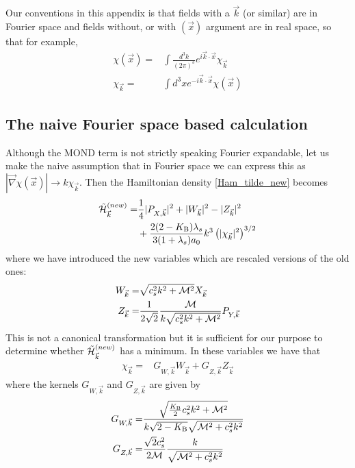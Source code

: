 \documentclass[twocolumn,prd,preprintnumbers,amsmath,amssymb,nofootinbib,superscriptaddress]{revtex4-1}
\newcommand{\grad}{\ensuremath{\vec{\nabla}}}
\newcommand{\lambdas}{\lambda_s}
\newcommand{\Mcal}{{\cal M}}
\newcommand{\Hcal}{{\cal H}}
\newcommand{\KB}{\ensuremath{K_{{\rm B}}}}
\begin{document}
Our conventions in this appendix is that fields with a $\vec{k}$ (or similar) are in Fourier space and fields without, or with $(\vec{x})$ argument are in real space, so that for example,
\begin{align}
\chi(\vec{x}) =& \int \frac{d^3k}{(2\pi)^3} e^{i\vec{k}\cdot\vec{x}} \chi_{\vec{k}} 
\\
\chi_{\vec{k}} =& \int d^3x e^{-i\vec{k}\cdot\vec{x}} \chi(\vec{x})
\end{align}

\subsection{The naive Fourier space based calculation}
Although the MOND term is not strictly speaking Fourier expandable, let us make the naive assumption that in Fourier space we can express 
this as $|\grad \chi(\vec{x})| \rightarrow k \chi_{\vec{k}}$. Then
the Hamiltonian density \eqref{Ham_tilde_new} becomes
\begin{align}
\tilde{\Hcal}^{(new)}_{\vec{k}} =& \frac{1}{4} |P_{X,\vec{k}}|^2 +  |W_{\vec{k}}|^2 - |Z_{\vec{k}}|^2
\\
&
 + \frac{2(2-\KB)\lambdas}{3 (1+\lambdas) a_0} k^3 \left( |\chi_{\vec{k}}|^2 \right)^{3/2}
\end{align}
where we have introduced the new variables which are rescaled versions of the old ones:
\begin{align}
W_{\vec{k}} =& \sqrt{ c_s^2 k^2 + \Mcal^2  } X_{\vec{k}}
\\
Z_{\vec{k}} =& \frac{1}{2\sqrt{2}} \frac{\Mcal}{k \sqrt{ c_s^2 k^2 + \Mcal^2  }} P_{Y,\vec{k}}
\end{align}
 This is not a canonical transformation but it is sufficient for our purpose to determine whether $\tilde{\Hcal}^{(new)}_{\vec{k}}$ has a minimum. In these variables we have that
\begin{align}
\chi_{\vec{k}} =& G_{W,\vec{k}} W_{\vec{k}} +  G_{Z,\vec{k}} Z_{\vec{k}} 
\end{align}
where the kernels $ G_{W,\vec{k}}$ and $  G_{Z,\vec{k}}$ are given by
\begin{align}                                                                                                                                                
G_{W,\vec{k}} =& \frac{\sqrt{\frac{\KB}{2}  c_s^2 k^2  +  \Mcal^2 } }{  k  \sqrt{2-\KB} \sqrt{\Mcal^2 + c_s^2 k^2}}
\\
G_{Z,\vec{k}} =& \frac{\sqrt{2} c_s^2}{2\Mcal}  \frac{k}{\sqrt{\Mcal^2 + c_s^2 k^2}}  
\end{align} 
\end{document}
